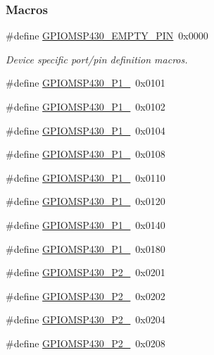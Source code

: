\subsubsection*{Macros}
\begin{DoxyCompactItemize}
\item 
\#define \hyperlink{_g_p_i_o_m_s_p430_8h_ad082ce637bdbfdd80921aa6ec6399699}{G\+P\+I\+O\+M\+S\+P430\+\_\+\+E\+M\+P\+T\+Y\+\_\+\+P\+I\+N}~0x0000
\begin{DoxyCompactList}\small\item\em Device specific port/pin definition macros. \end{DoxyCompactList}\item 
\#define \hyperlink{_g_p_i_o_m_s_p430_8h_a800bc7eb90c8c4f2c198744400a4bb56}{G\+P\+I\+O\+M\+S\+P430\+\_\+\+P1\+\_}~0x0101
\item 
\#define \hyperlink{_g_p_i_o_m_s_p430_8h_a608ceeb89afc69fb5474e25325e8999a}{G\+P\+I\+O\+M\+S\+P430\+\_\+\+P1\+\_}~0x0102
\item 
\#define \hyperlink{_g_p_i_o_m_s_p430_8h_a00149fdacbf028bf1d38665053352ed3}{G\+P\+I\+O\+M\+S\+P430\+\_\+\+P1\+\_}~0x0104
\item 
\#define \hyperlink{_g_p_i_o_m_s_p430_8h_a57f0961f6ea13712637d71b6f83fccae}{G\+P\+I\+O\+M\+S\+P430\+\_\+\+P1\+\_}~0x0108
\item 
\#define \hyperlink{_g_p_i_o_m_s_p430_8h_affaf9b93962ee55b91fbcc332253cb14}{G\+P\+I\+O\+M\+S\+P430\+\_\+\+P1\+\_}~0x0110
\item 
\#define \hyperlink{_g_p_i_o_m_s_p430_8h_a7a128c50b76538505a551d79af1e6f93}{G\+P\+I\+O\+M\+S\+P430\+\_\+\+P1\+\_}~0x0120
\item 
\#define \hyperlink{_g_p_i_o_m_s_p430_8h_abbb5168e38ffa78d8ae1f7c4ccb1e10c}{G\+P\+I\+O\+M\+S\+P430\+\_\+\+P1\+\_}~0x0140
\item 
\#define \hyperlink{_g_p_i_o_m_s_p430_8h_a3b34ae7e91b39d4eb7bad10e694c6d9d}{G\+P\+I\+O\+M\+S\+P430\+\_\+\+P1\+\_}~0x0180
\item 
\#define \hyperlink{_g_p_i_o_m_s_p430_8h_aa0db75cfafbe4a3a4e87b62b2181f0c9}{G\+P\+I\+O\+M\+S\+P430\+\_\+\+P2\+\_}~0x0201
\item 
\#define \hyperlink{_g_p_i_o_m_s_p430_8h_aab82df8ff216ae1495946ca70d72d38f}{G\+P\+I\+O\+M\+S\+P430\+\_\+\+P2\+\_}~0x0202
\item 
\#define \hyperlink{_g_p_i_o_m_s_p430_8h_a93f25ffa1706fecdd5c9af2d237f3ecb}{G\+P\+I\+O\+M\+S\+P430\+\_\+\+P2\+\_}~0x0204
\item 
\#define \hyperlink{_g_p_i_o_m_s_p430_8h_a8b4607e71c3a31e7e7ce441603478a39}{G\+P\+I\+O\+M\+S\+P430\+\_\+\+P2\+\_}~0x0208

\end{DoxyCompactItemize}
